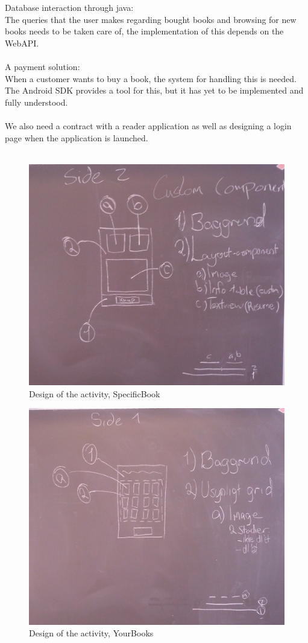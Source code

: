 \documentclass[12pt]{article}
\begin{document}
Database interaction through java:\\
The queries that the user makes regarding bought books and browsing for new books needs to be taken care of, the implementation of this depends on the WebAPI.\\
\\
A payment solution:\\
When a customer wants to buy a book, the system for handling this is needed. The Android SDK provides a tool for this, but it has yet to be implemented and fully understood.\\
\\
We also need a contract with a reader application as well as designing a login page when the application is launched.
\\\\
\begin{figure}
 \includegraphics[scale=0.2]{Tavle}
\caption{Design of the activity, SpecificBook}
\label{Table0}
\end{figure}
\begin{figure}
\includegraphics[scale=0.2]{Tavle1}
\caption{Design of the activity, YourBooks}
\label{Table1}
\end{figure}
\newpage
\end{document}
